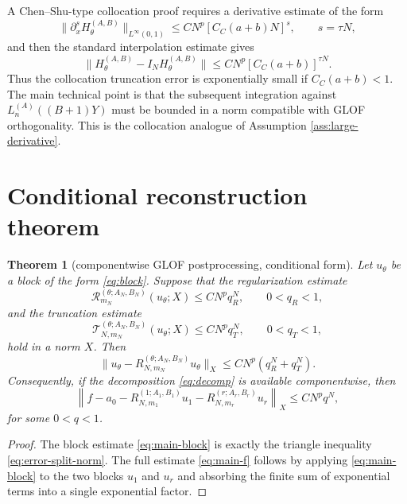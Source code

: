 \documentclass[11pt]{article}
\newtheorem{theorem}{Theorem}
\newcommand{\cT}{\mathcal{T}}
\newcommand{\cR}{\mathcal{R}}
\newcommand{\Lag}{L}
\begin{document}
A Chen--Shu-type collocation proof requires a derivative estimate of the form
\begin{equation}\label{eq:colloc-derivative-bound}
    \|\partial_x^s H_{\theta}^{(A,B)}\|_{L^\infty(0,1)}
    \le C N^p [C_C(a+b)N]^s,
    \qquad s=\tau N,
\end{equation}
and then the standard interpolation estimate gives
\begin{equation}\label{eq:colloc-interp-bound}
    \|H_{\theta}^{(A,B)}-I_NH_{\theta}^{(A,B)}\|
    \le C N^p [C_C(a+b)]^{\tau N}.
\end{equation}
Thus the collocation truncation error is exponentially small if $C_C(a+b)<1$.  The main technical point is that the subsequent integration against $\Lag_n^{(A)}((B+1)Y)$ must be bounded in a norm compatible with GLOF orthogonality.  This is the collocation analogue of Assumption \ref{ass:large-derivative}.

\section{Conditional reconstruction theorem}

\begin{theorem}[componentwise GLOF postprocessing, conditional form]\label{thm:main-conditional}
Let $u_\theta$ be a block of the form \eqref{eq:block}.  Suppose that the regularization estimate
\begin{equation}\label{eq:assumed-reg}
    \cR_{m_N}^{(\theta;A_N,B_N)}(u_\theta;X)
    \le C N^p q_R^N,
    \qquad 0<q_R<1,
\end{equation}
and the truncation estimate
\begin{equation}\label{eq:assumed-trunc}
    \cT_{N,m_N}^{(\theta;A_N,B_N)}(u_\theta;X)
    \le C N^p q_T^N,
    \qquad 0<q_T<1,
\end{equation}
hold in a norm $X$.  Then
\begin{equation}\label{eq:main-block}
    \|u_\theta-R_{N,m_N}^{(\theta;A_N,B_N)}u_\theta\|_X
    \le C N^p(q_R^N+q_T^N).
\end{equation}
Consequently, if the decomposition \eqref{eq:decomp} is available componentwise, then
\begin{equation}\label{eq:main-f}
    \left\|f-a_0-R_{N,m_1}^{(1;A_1,B_1)}u_1-R_{N,m_r}^{(r;A_r,B_r)}u_r\right\|_X
    \le C N^p q^N,
\end{equation}
for some $0<q<1$.
\end{theorem}

\begin{proof}
The block estimate \eqref{eq:main-block} is exactly the triangle inequality \eqref{eq:error-split-norm}.  The full estimate \eqref{eq:main-f} follows by applying \eqref{eq:main-block} to the two blocks $u_1$ and $u_r$ and absorbing the finite sum of exponential terms into a single exponential factor.
\end{proof}
\end{document}
